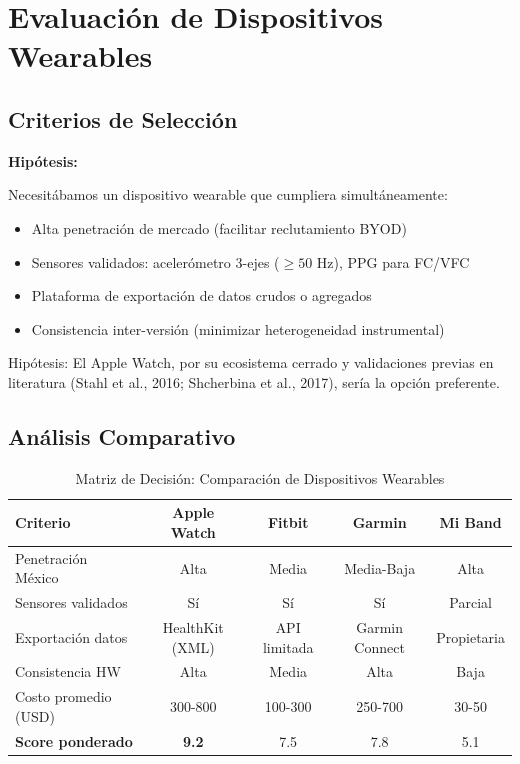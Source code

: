 \documentclass[12pt,letterpaper,twoside]{report}
\begin{document}
\section{Evaluación de Dispositivos Wearables}

\subsection{Criterios de Selección}

\begin{hipotesisbox}
\textbf{Hipótesis:}

Necesitábamos un dispositivo wearable que cumpliera simultáneamente:
\begin{itemize}[noitemsep]
    \item Alta penetración de mercado (facilitar reclutamiento BYOD)
    \item Sensores validados: acelerómetro 3-ejes ($\geq 50$ Hz), PPG para FC/VFC
    \item Plataforma de exportación de datos crudos o agregados
    \item Consistencia inter-versión (minimizar heterogeneidad instrumental)
\end{itemize}

Hipótesis: El Apple Watch, por su ecosistema cerrado y validaciones previas en literatura (Stahl et al., 2016; Shcherbina et al., 2017), sería la opción preferente.
\end{hipotesisbox}

\subsection{Análisis Comparativo}

\begin{table}[H]
\centering
\caption{Matriz de Decisión: Comparación de Dispositivos Wearables}
\label{tab:wearables_comparison}
\begin{tabular}{@{}lcccc@{}}
\toprule
\textbf{Criterio} & \textbf{Apple Watch} & \textbf{Fitbit} & \textbf{Garmin} & \textbf{Mi Band} \\
\midrule
Penetración México & Alta & Media & Media-Baja & Alta \\
Sensores validados & Sí & Sí & Sí & Parcial \\
Exportación datos & HealthKit (XML) & API limitada & Garmin Connect & Propietaria \\
Consistencia HW & Alta & Media & Alta & Baja \\
Costo promedio (USD) & 300-800 & 100-300 & 250-700 & 30-50 \\
\textbf{Score ponderado} & \textbf{9.2} & 7.5 & 7.8 & 5.1 \\
\bottomrule
\end{tabular}
\end{table}
\end{document}
